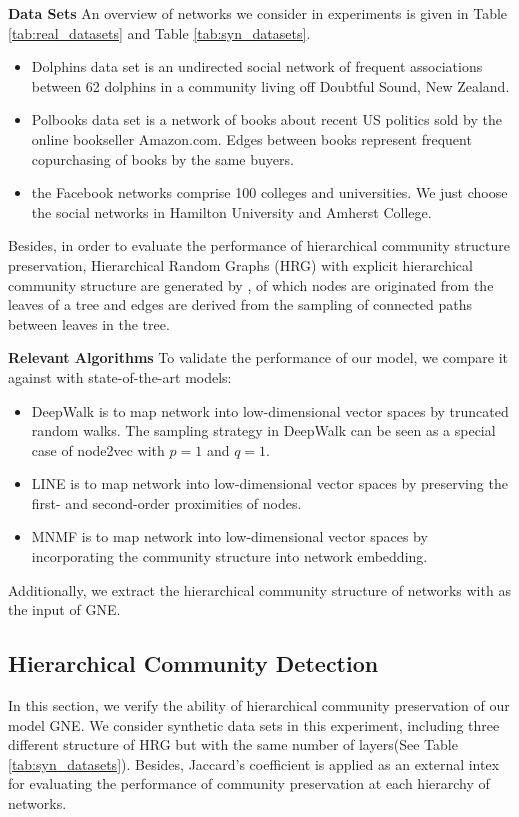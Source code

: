 \documentclass{article}
\theoremstyle{definition}
\begin{document}
	\noindent \textbf{Data Sets} 
	An overview of networks we consider in experiments is given in Table \ref{tab:real_datasets} and Table \ref{tab:syn_datasets}. 
	\begin{itemize}
		\item Dolphins data set \cite{lusseau2003bottlenose} is an undirected social network of frequent associations between 62 dolphins in a community living off Doubtful Sound, New Zealand.
		\item Polbooks data set \cite{polbooks} is a network of books about recent US politics sold by the online bookseller Amazon.com. Edges between books represent frequent copurchasing of books by the same buyers.
		\item the Facebook networks \cite{Traud2012Social} comprise 100 colleges and universities. We just choose the social networks in Hamilton University and Amherst College.
	\end{itemize}

	 Besides, in order to evaluate the performance of hierarchical community structure preservation, Hierarchical Random Graphs (HRG) with explicit hierarchical community structure are generated by \cite{clauset2008hierarchical}, of which nodes are originated from the leaves of a tree and edges are derived from the sampling of connected paths between leaves in the tree.

	\noindent \textbf{Relevant Algorithms}
	To validate the performance of our model, we compare it against with state-of-the-art models:
	\begin{itemize}
		\item DeepWalk \cite{Perozzi2014DeepWalk} is to map network into low-dimensional vector spaces by truncated random walks. The sampling strategy in DeepWalk can be seen as a special case of node2vec with $p=1$ and $q=1$.
		\item LINE \cite{Tang2015LINE} is to map network into low-dimensional vector spaces by preserving the first- and second-order proximities of nodes.  
		\item MNMF \cite{Wang2017Community} is to map network into low-dimensional vector spaces by incorporating the community structure into network embedding.
	\end{itemize}

	Additionally, we extract the hierarchical community structure of networks with \cite{Tsvetovat2011Social} as the input of GNE.  

	\subsection{Hierarchical Community Detection}
	In this section, we verify the ability of hierarchical community preservation of our model GNE. We consider synthetic data sets in this experiment, including three different structure of HRG but with the same number of layers(See Table \ref{tab:syn_datasets}). Besides, Jaccard's coefficient \cite{halkidi2001clustering} is applied as an external intex for evaluating the performance of community preservation at each hierarchy of networks.
	
\end{document}
